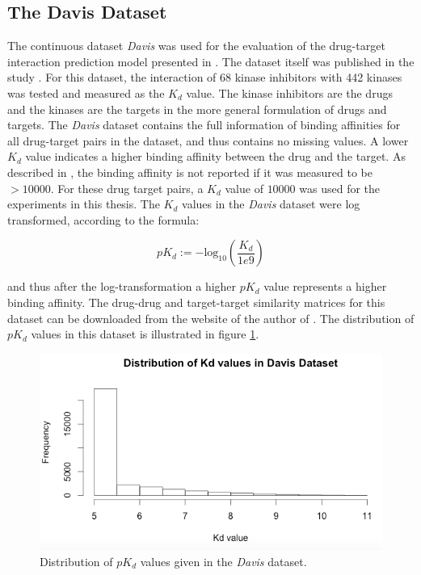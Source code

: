 \subsection{The Davis Dataset}

The continuous dataset \textit{Davis} was used for the evaluation of the drug-target interaction prediction model presented in \cite{pahikkala2014toward}. The dataset itself was published in the study \cite{davis2011comprehensive}. For this dataset, the interaction of 68 kinase inhibitors with 442 kinases was tested and measured as the $K_d$ value. The kinase inhibitors are the drugs and the kinases are the targets in the more general formulation of drugs and targets. The \textit{Davis} dataset contains the full information of binding affinities for all drug-target pairs in the dataset, and thus contains no missing values. A lower $K_d$ value indicates a higher binding affinity between the drug and the target. As described in \cite{davis2011comprehensive}, the binding affinity is not reported if it was measured to be $>10000$. For these drug target pairs, a $K_d$ value of $10000$ was used for the experiments in this thesis.
The $K_d$ values in the \textit{Davis} dataset were log transformed, according to the formula:

\begin{equation}
pK_d:= -\text{log}_{10}(\frac{K_d}{1e9})
\end{equation}

and thus after the log-transformation a higher $pK_d$ value represents a higher binding affinity. The drug-drug and target-target similarity matrices for this dataset can be downloaded from the website of the author of \cite{pahikkala2014toward}. The distribution of $pK_d$ values in this dataset is illustrated in figure \ref{fig:davis_dist}.

\begin{figure}
\begin{center}
\includegraphics[scale=0.6]{davis_dist.png}
\end{center}
\caption{Distribution of $pK_d$ values given in the \textit{Davis} dataset.}
\label{fig:davis_dist}
\end{figure}

